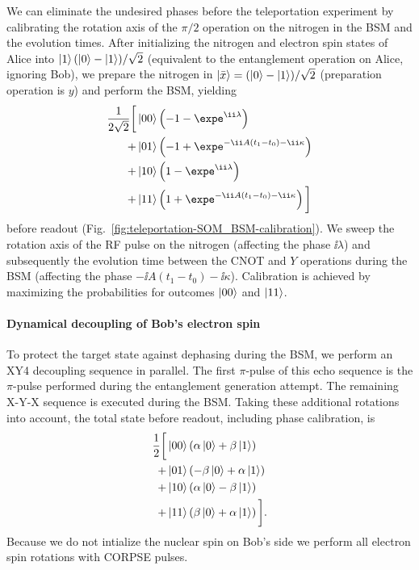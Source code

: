 We can eliminate the undesired phases before the teleportation experiment by calibrating the rotation axis of the $\pi/2$ operation on the nitrogen in the BSM and the evolution times. After initializing the nitrogen and electron spin states of Alice into $\left|1\right>(\left|0\right> - \left|1\right>)/\sqrt{2}$ (equivalent to the entanglement operation on Alice, ignoring Bob), we prepare the nitrogen in $\left|\bar x\right> = (\left|0\right> - \left|1\right>)/\sqrt{2}$ (preparation operation is $y$) and perform the BSM, yielding
\begin{align}
    \frac{1}{2\sqrt2} \bigg[
          & \ket{00} \left( -1 - \expe^{\ii\lambda} \right) \notag\\
        + & \ket{01} \left( -1 + 
            \expe^{-\ii A(t_1-t_0) -\ii\kappa} \right) \notag\\
        + & \ket{10} \left( 1 - \expe^{\ii\lambda} \right) \notag\\
        + & \ket{11} \left( 1 + \expe^{-\ii A(t_1-t_0) -\ii\kappa} \right)
    \bigg]
\end{align}
before readout (Fig.~\ref{fig:teleportation-SOM_BSM-calibration}). We sweep the rotation axis of the RF pulse on the nitrogen (affecting the phase $\ii\lambda$) and subsequently the evolution time between the CNOT and $Y$ operations during the BSM (affecting the phase $-\ii A(t_1-t_0) -\ii\kappa$). Calibration is achieved by maximizing the probabilities for outcomes $\left|00\right>$ and $\left|11\right>$. 

\paragraph{Dynamical decoupling of Bob's electron spin}

To protect the target state against dephasing during the BSM, we perform an XY4 decoupling sequence in parallel. The first $\pi$-pulse of this echo sequence is the $\pi$-pulse performed during the entanglement generation attempt. The remaining X-Y-X sequence is executed during the BSM. Taking these additional rotations into account, the total state before readout, including phase calibration, is
\begin{align}
    \label{eq:BSM-outcomes}
    \frac{1}{2} \bigg[
          & \left|00\right> \left( \alpha\left|0\right> + \beta\left|1\right> \right) \notag\\
        + & \left|01\right> \left( -\beta\left|0\right> + \alpha\left|1\right> \right) \notag\\
        + & \left|10\right> \left( \alpha\left|0\right> - \beta\left|1\right> \right) \notag\\
        + & \left|11\right> \left( \beta\left|0\right> + \alpha\left|1\right> \right)
    \bigg].
\end{align}
Because we do not intialize the nuclear spin on Bob's side we perform all electron spin rotations with CORPSE pulses\cite{2003PhRvA..67d2308C}.

